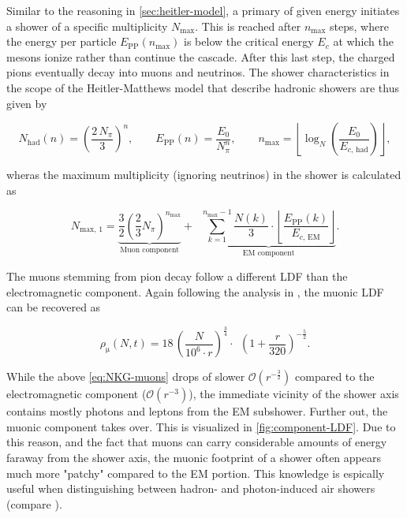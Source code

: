 Similar to the reasoning in \autoref{sec:heitler-model}, a primary of given energy initiates a shower of a specific multiplicity $N_\text{max}$. This is reached 
after $n_\text{max}$ steps, where the energy per particle $E_\text{PP}(n_\text{max})$ is below the critical energy $E_c$ at which the mesons ionize rather than 
continue the cascade. After this last step, the charged pions eventually decay into muons and neutrinos. The shower characteristics in the scope of the 
Heitler-Matthews model that describe hadronic showers are thus given by

\begin{equation}
N_\text{had}(n) = \left(\frac{2\,N_\pi}{3}\right)^n,\qquad E_\text{PP}(n) = \frac{E_0}{N_\pi^n},\qquad n_\text{max}=\left\lfloor\log_N\left(\frac{E_0}{E_{c,\,\text{had}}}\right)\right\rfloor,
\end{equation}

wheras the maximum multiplicity (ignoring neutrinos) in the shower is calculated as

\begin{equation}
\label{eq:n-max-matthews}
N_{\text{max},\,1} = \underbrace{ \frac{3}{2}\left( \frac{2}{3}N_\pi\right)^{n_\text{max}}  }_\text{Muon component} + \;\; 
		     \underbrace{\sum\limits_{k = 1}^{n_\text{max}-1} \frac{N(k)}{3} \cdot \left\lfloor 
		     \frac{E_\text{PP}(k) }{E_{c,\,\text{EM}}}\right\rfloor}_\text{EM component}.
\end{equation}

The muons stemming from pion decay follow a different LDF than the electromagnetic component. Again following the analysis in \cite{greisen1960cosmic}, the muonic
LDF can be recovered as

\begin{equation}
\label{eq:NKG-muons}
\rho_\upmu(N, t) = 18\,\left(\frac{N}{10^6 \cdot r}\right)^\frac{3}{4} \cdot \;\,\left(1 + \frac{r}{320}\right)^{-\frac{5}{2}}.
\end{equation}

While the above \autoref{eq:NKG-muons} drops of slower $\mathcal{O}(r^{-\frac{3}{2}})$ compared to the electromagnetic component ($\mathcal{O}(r^{-3})$), the
immediate vicinity of the shower axis contains mostly photons and leptons from the EM subshower. Further out, the muonic component takes over. This is visualized
in \autoref{fig:component-LDF}. Due to this reason, and the fact that muons can carry considerable amounts of energy faraway from the shower axis, the muonic 
footprint of a shower often appears much more "patchy" compared to the EM portion. This knowledge is espically useful when distinguishing between hadron- and 
photon-induced air showers (compare \cite{capistran2015new}).

